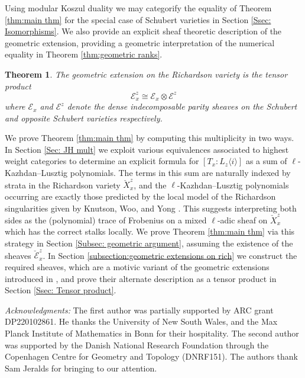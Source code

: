 \documentclass[11pt]{article}
\newtheorem{thm}{Theorem}
\theoremstyle{remark}
\theoremstyle{definition}
\begin{document}
    Using modular Koszul duality we may categorify the equality of Theorem \ref{thm:main thm} for the special case of Schubert varieties in Section \ref{Ssec: Isomorphisms}. We also provide an explicit sheaf theoretic description of the geometric extension, providing a geometric interpretation of the numerical equality in Theorem \ref{thm:geometric ranks}.
    \par 
    \begin{thm}
\label{Thm: Tensor product}
    The geometric extension on the Richardson variety is the tensor product \[\mathscr{E}^z_x\cong \mathscr{E}_x\otimes \mathscr{E}^z\] where $\mathscr{E}_x$ and $\mathscr{E}^z$ denote the dense indecomposable parity sheaves on the Schubert and opposite Schubert varieties respectively.
    \end{thm}
    
    We prove Theorem \ref{thm:main thm} by computing this multiplicity in two ways. In Section \ref{Sec: JH mult} we exploit various equivalences associated to highest weight categories to determine an explicit formula for $[T_x: L_z \langle i \rangle]$ as a sum of $\ell$-Kazhdan--Lusztig polynomials. 
	The terms in this sum are naturally indexed by strata in the Richardson variety $\check{X}^z_x$, and the $\ell$-Kazhdan--Lusztig polynomials occurring are exactly those predicted by the local model of the Richardson singularities given by Knutson, Woo, and Yong \cite{KWY13}. 
	This suggests interpreting both sides as the (polynomial) trace of Frobenius on a mixed $\ell$-adic sheaf on $\check{X}^z_x$ which has the correct stalks locally. We prove Theorem \ref{thm:main thm} via this strategy in Section \ref{Subsec: geometric argument}, assuming the existence of the sheaves $\check{\mathscr{E}}^z_x$.
    In Section \ref{subsection:geometric extensions on rich} we construct the required sheaves, which are a motivic variant of the geometric extensions introduced in \cite{HW23,McN18}, and prove their alternate description as a tensor product in Section \ref{Ssec: Tensor product}.
    
    \par 
	\emph{Acknowledgments:}
    The first author was partially supported by ARC grant DP220102861. 
    He thanks the University of New South Wales, and the Max Planck Institute of Mathematics in Bonn for their hospitality. 
	The second author was supported by the Danish National Research Foundation through the Copenhagen Centre for Geometry and Topology (DNRF151).
    The authors thank Sam Jeralds for bringing \cite{KLS14} to our attention.
\end{document}
